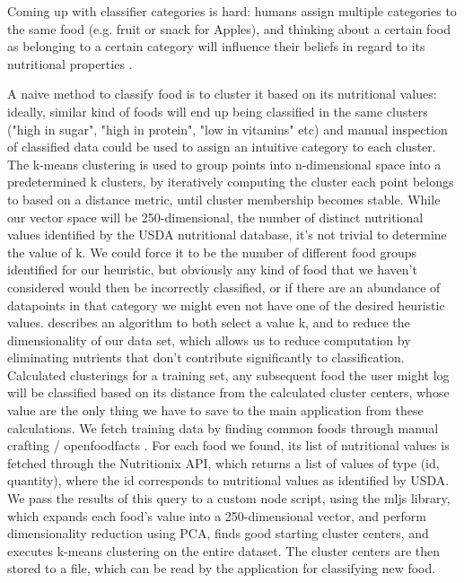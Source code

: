 Coming up with classifier categories is hard: humans assign multiple categories to the same food (e.g. fruit or snack for Apples), and thinking about a certain food as belonging to a certain category will influence their beliefs in regard to its nutritional properties \cite{Hayes2011}.


A naive method to classify food is to cluster it based on its nutritional values: ideally, similar kind of foods will end up being classified in the same clusters ("high in sugar", "high in protein", "low in vitamins" etc) and manual inspection of classified data could be used to assign an intuitive category to each cluster.
The k-means clustering is used to group points into n-dimensional space into a predetermined k clusters, by iteratively computing the cluster each point belongs to based on a distance metric, until cluster membership becomes stable. While our vector space will be 250-dimensional, the number of distinct nutritional values identified by the USDA nutritional database, it's not trivial to determine the value of k. We could force it to be the number of different food groups identified for our heuristic, but obviously any kind of food that we haven't considered would then be incorrectly classified, or if there are an abundance of datapoints in that category we might even not have one of the desired heuristic values. \cite{Napoleon, 2011} describes an algorithm to both select a value k, and to reduce the dimensionality of our data set, which allows us to reduce computation by eliminating nutrients that don't contribute significantly to classification.
Calculated clusterings for a training set, any subsequent food the user might log will be classified based on its distance from the calculated cluster centers, whose value are the only thing we have to save to the main application from these calculations.
We fetch training data by finding common foods through { manual crafting / openfoodfacts }. For each food we found, its list of nutritional values is fetched through the Nutritionix API, which returns a list of values of type (id, quantity), where the id corresponds to nutritional values as identified by USDA. We pass the results of this query to a custom node script, using the mljs library, which expands each food's value into a 250-dimensional vector, and perform dimensionality reduction using PCA, finds good starting cluster centers, and executes k-means clustering on the entire dataset. The cluster centers are then stored to a file, which can be read by the application for classifying new food.



